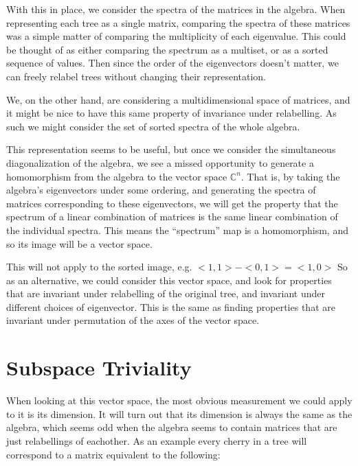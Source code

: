 \documentclass{report}
\begin{document}
With this in place, we consider the spectra of the matrices in the algebra.
When representing each tree as a single matrix, comparing the spectra of these
matrices was a simple matter of comparing the multiplicity of each eigenvalue.
This could be thought of as either comparing the spectrum as a multiset, or as
a sorted sequence of values.
Then since the order of the eigenvectors doesn't matter, we can freely relabel
trees without changing their representation.

We, on the other hand, are considering a multidimensional space of matrices,
and it might be nice to have this same property of invariance under
relabelling.
As such we might consider the set of sorted spectra of the whole algebra.

This representation seems to be useful, but once we consider the simultaneous
diagonalization of the algebra, we see a missed opportunity to generate a
homomorphism from the algebra to the vector space $\mathds{C}^n$.
That is, by taking the algebra's eigenvectors under some ordering, and
generating the spectra of matrices corresponding to these eigenvectors, we will
get the property that the spectrum of a linear combination of matrices is the
same linear combination of the individual spectra.
This means the ``spectrum'' map is a homomorphism, and so its image will be a
vector space.

This will not apply to the sorted image, e.g. $<1, 1> - <0, 1> = <1, 0>$
So as an alternative, we could consider this vector space, and look for
properties that are invariant under relabelling of the original tree, and
invariant under different choices of eigenvector.
This is the same as finding properties that are invariant under permutation of
the axes of the vector space.


\section{Subspace Triviality}

When looking at this vector space, the most obvious measurement we could apply
to it is its dimension.
It will turn out that its dimension is always the same as the algebra, which
seems odd when the algebra seems to contain matrices that are just relabellings
of eachother.
As an example every cherry in a tree will correspond to a matrix equivalent to
the following:
\end{document}
